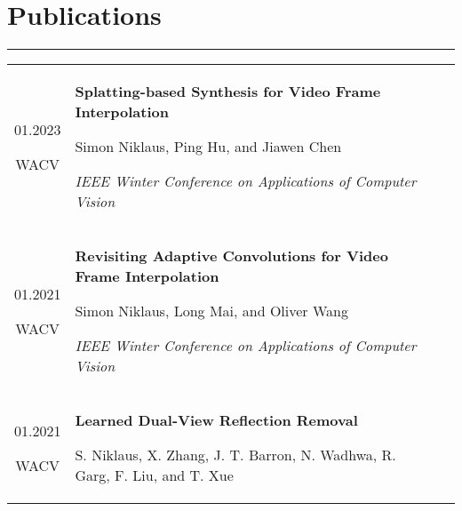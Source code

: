 \documentclass[10pt]{article}
\begin{document}
\vspace*{-0.8cm}

\section*{Publications}
\vspace{-0.3cm}
{\color{E6E6E6} \hrule height 0.04cm}
\vspace{0.4cm}
\renewcommand{\arraystretch}{1.0}
\begin{tabular}{C Z D}
	{
		01.2023
		
		\vspace{-0.05cm}
		
		{\scriptsize WACV}
	}
	&
	{
		{\bf Splatting-based Synthesis for Video Frame Interpolation}
		
		\vspace{0.00cm}
		
		{\scriptsize Simon Niklaus, Ping Hu, and Jiawen Chen}
		
		\vspace{0.05cm}
		
		{\scriptsize \it IEEE Winter Conference on Applications of Computer Vision}
		
		\vspace{0.0cm}
	}
	\\
	{
		01.2021
		
		\vspace{-0.05cm}
		
		{\scriptsize WACV}
	}
	&
	{
		{\bf Revisiting Adaptive Convolutions for Video Frame Interpolation}
		
		\vspace{0.00cm}
		
		{\scriptsize Simon Niklaus, Long Mai, and Oliver Wang}
		
		\vspace{0.05cm}
		
		{\scriptsize \it IEEE Winter Conference on Applications of Computer Vision}
		
		\vspace{0.0cm}
	}
	\\
	{
		01.2021
		
		\vspace{-0.05cm}
		
		{\scriptsize WACV}
	}
	&
	{
		{\bf Learned Dual-View Reflection Removal}
		
		\vspace{0.00cm}
		
		{\scriptsize S. Niklaus, X. Zhang, J. T. Barron, N. Wadhwa, R. Garg, F. Liu, and T. Xue}
		
}
\end{tabular}
\end{document}
